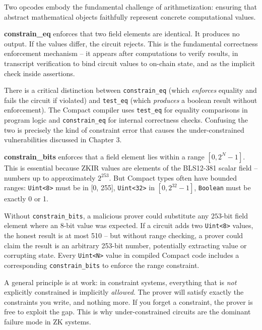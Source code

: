\documentclass[
  11pt,
  openany]{report}
\renewcommand{\textbf}[1]{{\bfseries\color{MidnightBold}#1}}
\begin{document}
Two opcodes embody the fundamental challenge of arithmetization: ensuring that
abstract mathematical objects faithfully represent concrete computational
values.

\textbf{constrain\_eq} enforces that two field elements are identical. It
produces no output. If the values differ, the circuit rejects. This is the
fundamental correctness enforcement mechanism -- it appears after computations
to verify results, in transcript verification to bind circuit values to on-chain
state, and as the implicit check inside assertions.

There is a critical distinction between \texttt{constrain\_eq} (which
\emph{enforces} equality and fails the circuit if violated) and
\texttt{test\_eq} (which \emph{produces} a boolean result without enforcement).
The Compact compiler uses \texttt{test\_eq} for equality comparisons in program
logic and \texttt{constrain\_eq} for internal correctness checks. Confusing the
two is precisely the kind of constraint error that causes the under-constrained
vulnerabilities discussed in Chapter 3.

\textbf{constrain\_bits} enforces that a field element lies within a range
\([0, 2^N - 1]\). This is essential because ZKIR values are elements of the
BLS12-381 scalar field -- numbers up to approximately \(2^{253}\). But Compact
types often have bounded ranges: \texttt{Uint\textless{}8\textgreater{}} must be
in {[}0, 255{]}, \texttt{Uint\textless{}32\textgreater{}} in
\([0, 2^{32} - 1]\), \texttt{Boolean} must be exactly 0 or 1.

Without \texttt{constrain\_bits}, a malicious prover could substitute any
\(253\)-bit field element where an \(8\)-bit value was expected. If a circuit
adds two \texttt{Uint\textless{}8\textgreater{}} values, the honest result is at
most 510 -- but without range checking, a prover could claim the result is an
arbitrary 253-bit number, potentially extracting value or corrupting state.
Every \texttt{Uint\textless{}N\textgreater{}} value in compiled Compact code
includes a corresponding \texttt{constrain\_bits} to enforce the range
constraint.

A general principle is at work: in constraint systems, everything that is
\emph{not} explicitly constrained is implicitly \emph{allowed}. The prover will
satisfy exactly the constraints you write, and nothing more. If you forget a
constraint, the prover is free to exploit the gap. This is why under-constrained
circuits are the dominant failure mode in ZK systems.
\end{document}
